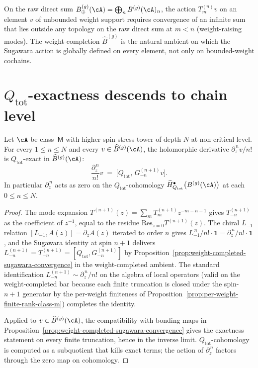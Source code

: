 \begin{remark}
\label{rem:raw-direct-sum-fails-for-sugawara}
On the raw direct sum $B^{(g)}_{\oplus}(\cA) =
\bigoplus_n B^{(g)}(\cA)_n$, the action $T^{(n)}_m v$ on an element
$v$ of unbounded weight support requires convergence of an infinite
sum that lies outside any topology on the raw direct sum at $m < n$
(weight-raising modes). The weight-completion $\widehat{B}^{(g)}$ is
the natural ambient on which the Sugawara action is globally defined
on every element, not only on bounded-weight cochains.
\end{remark}

\section{$Q_{\mathrm{tot}}$-exactness descends to chain level}
\label{sec:weight-completed-Q-tot-exactness}

\begin{proposition}
\label{prop:weight-completed-Q-tot-exactness}
\ClaimStatusProvedHere
Let $\cA$ be class~$\mathsf{M}$ with higher-spin stress tower of depth
$N$ at non-critical level. For every $1 \le n \le N$ and every
$v \in \widehat{B}^{(g)}(\cA)$, the holomorphic derivative
$\partial_z^{\,n} v / n!$ is $Q_{\mathrm{tot}}$-exact in
$\widehat{B}^{(g)}(\cA)$:
\[
 \frac{\partial_z^{\,n}}{n!} v
 \;=\;
 \bigl[Q_{\mathrm{tot}},\, G^{(n+1)}_{-n} v\bigr].
\]
In particular $\partial_z^{\,n}$ acts as zero on the $Q_{\mathrm{tot}}$-cohomology
$\widehat{H}^{\bullet}_{Q_{\mathrm{tot}}}\bigl(B^{(g)}(\cA)\bigr)$
at each $0 \le n \le N$.
\end{proposition}

\begin{proof}
The mode expansion $T^{(n+1)}(z) = \sum_m T^{(n+1)}_m z^{-m - n - 1}$
gives $T^{(n+1)}_{-n}$ as the coefficient of $z^{-1}$, equal to the
residue $\mathrm{Res}_{z = 0} T^{(n+1)}(z)$. The chiral $L_{-1}$
relation $[L_{-1}, A(z)] = \partial_z A(z)$ iterated to order $n$
gives $L_{-1}^{\,n} / n! \cdot \mathbf{1} = \partial_z^{\,n}/n! \cdot
\mathbf{1}$, and the Sugawara identity at spin $n + 1$ delivers
$L^{(n+1)}_{-n} = T^{(n+1)}_{-n} = [Q_{\mathrm{tot}}, G^{(n+1)}_{-n}]$
by Proposition~\ref{prop:weight-completed-sugawara-convergence} in the
weight-completed ambient. The standard identification
$L^{(n+1)}_{-n} \sim \partial_z^{\,n}/n!$ on the algebra of local
operators (valid on the weight-completed bar because each finite
truncation is closed under the spin-$n + 1$ generator by the per-weight
finiteness of Proposition~\ref{prop:per-weight-finite-rank-class-m})
completes the identity.

Applied to $v \in \widehat{B}^{(g)}(\cA)$, the compatibility with
bonding maps in Proposition~\ref{prop:weight-completed-sugawara-convergence}
gives the exactness statement on every finite truncation, hence in the
inverse limit. $Q_{\mathrm{tot}}$-cohomology is computed as a
subquotient that kills exact terms; the action of $\partial_z^{\,n}$
factors through the zero map on cohomology.
\end{proof}

